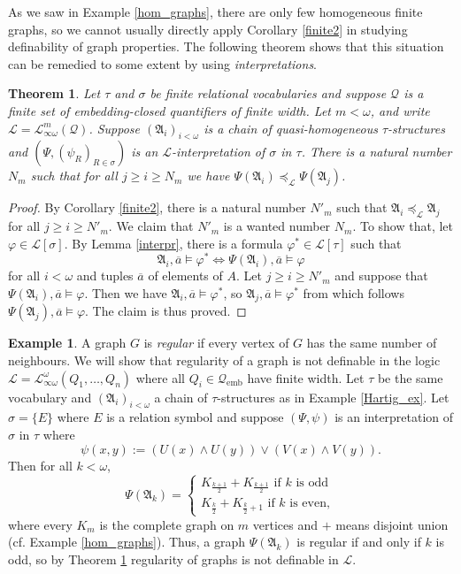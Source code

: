 \documentclass{ndjflart}
\theoremstyle{plain}
\newtheorem{theorem}[conjecture]{Theorem}
\theoremstyle{definition}
\newtheorem{example}[conjecture]{Example}
\numberwithin{equation}{section}
\DeclareMathOperator{\emb}{emb}
\begin{document}
As we saw in Example \ref{hom_graphs}, there are only few homogeneous finite graphs,
so we cannot usually directly apply Corollary \ref{finite2} in studying definability
of graph properties.
The following theorem shows that this situation can be remedied to some extent by using \emph{interpretations}.

\begin{theorem}\label{inter}
Let $\tau$ and $\sigma$ be finite relational vocabularies and suppose $\mathcal{Q}$ is a finite set of embedding-closed quantifiers of finite width.
Let $m < \omega$, and write $\mathcal{L} = \mathcal{L}^m_{\infty\omega}(\mathcal{Q})$. 
Suppose $(\mathfrak{A}_i)_{i<\omega}$ is a chain of quasi-homogeneous $\tau$-structures and 
$(\Psi,(\psi_R)_{R\in\sigma})$ is an $\mathcal{L}$-interpretation of $\sigma$ in $\tau$.
There is a natural number $N_m$ such that for all $j \geq i \geq N_m$ we have $\Psi(\mathfrak{A}_i) \preceq_{\mathcal{L}} \Psi(\mathfrak{A}_j)$.
\end{theorem}
\begin{proof}
By Corollary \ref{finite2}, there is a natural number $N'_m$ such that $\mathfrak{A}_i \preceq_{\mathcal{L}} \mathfrak{A}_j$ for all $j\geq i \geq N'_m$.
We claim that $N'_m$ is a wanted number $N_m$.
To show that, let $\varphi \in \mathcal{L}[\sigma]$.
By Lemma \ref{interpr}, there is a formula $\varphi^* \in \mathcal{L}[\tau]$ such that
\[
	\mathfrak{A}_i, \overline{a} \vDash \varphi^* \Leftrightarrow \Psi(\mathfrak{A}_i), \overline{a} \vDash \varphi
\]
for all $i<\omega$ and tuples $\overline{a}$ of elements of $A$.
Let $j \geq i \geq N'_m$ and suppose that $\Psi(\mathfrak{A}_i),\overline{a} \vDash \varphi$.
Then we have $\mathfrak{A}_i,\overline{a} \vDash \varphi^*$, so $\mathfrak{A}_j, \overline{a} \vDash \varphi^*$ from which follows $\Psi(\mathfrak{A}_j), \overline{a} \vDash \varphi$. The claim is thus proved. 
\end{proof}

\begin{example}
A graph $G$ is \emph{regular} if every vertex of $G$ has the same number of neighbours.
We will show that regularity of a graph is not definable in the logic $\mathcal{L} = \mathcal{L}^{\omega}_{\infty \omega}(Q_1,\dots,Q_n)$ where all $Q_i \in \mathcal{Q}_{\emb}$ have finite width.
Let $\tau$ be the same vocabulary and $(\mathfrak{A}_i)_{i<\omega}$ a chain of $\tau$-structures as in Example \ref{Hartig_ex}.
Let $\sigma = \{E\}$ where $E$ is a relation symbol and suppose
$(\Psi,\psi)$ is an interpretation of $\sigma$ in $\tau$ where
\[
	\psi(x,y) := (U(x)\wedge U(y)) \vee (V(x) \wedge V(y)).
\]
Then for all $k<\omega$,
\[
	\Psi(\mathfrak{A}_k) = \begin{cases}
	K_{\frac{k+1}{2}} + K_{\frac{k+1}{2}} \text{ if } k \text{ is odd} \\
	K_{\frac{k}{2}} + K_{\frac{k}{2}+1} \text{ if } k \text{ is even},
	\end{cases}
\]
where every $K_m$ is the complete graph on $m$ vertices and $+$ means disjoint union (cf. Example \ref{hom_graphs}).
Thus, a graph $\Psi(\mathfrak{A}_k)$ is regular if and only if $k$ is odd, 
so by Theorem \ref{inter} regularity of graphs is not definable in $\mathcal{L}$.
\end{example}
\end{document}

